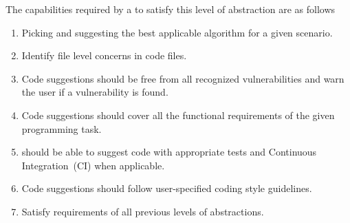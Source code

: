 The capabilities required by a \cct{} to satisfy this level of abstraction are as follows
\begin{enumerate}
    \item Picking and suggesting the best applicable algorithm for a given scenario.
    \item Identify file level concerns in code files.
    \item Code suggestions should be free from all recognized vulnerabilities and warn the user if a vulnerability is found.
    \item Code suggestions should cover all the functional requirements of the given programming task.
    \item \cct{} should be able to suggest code with appropriate tests and Continuous Integration~(CI) when applicable.
    \item Code suggestions should follow user-specified coding style guidelines.
    \item Satisfy requirements of all previous levels of abstractions.
\end{enumerate}

